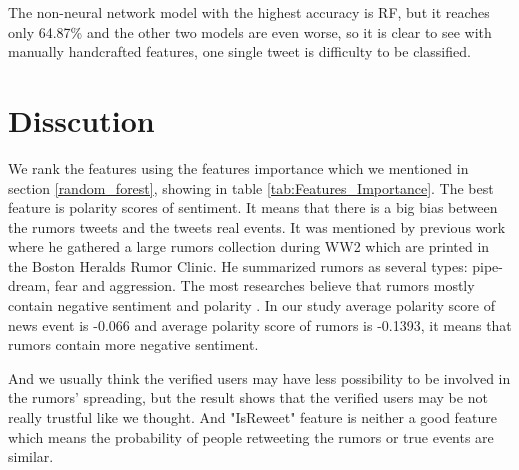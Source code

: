  The non-neural network model with the highest accuracy is RF, but it reaches only 64.87\% and the other two models are even worse, so it is clear to see with manually handcrafted features, one single tweet is difficulty to be classified.  
 \begin{table}[!h]
 \centering
{}
 \caption{Prediction Accuracy of Different Single Tweet's Creditability Scoring Models}
 \label{tab:single_result}
\end{table}
 
 \section{Disscution}  

 We rank the features using the features importance which we mentioned in section \ref{random_forest}, showing in table \ref{tab:Features_Importance}. The best feature is polarity scores of sentiment. It means that there is a big bias between the rumors tweets and the tweets real events. It was mentioned by previous work \cite{allport1947psychology} where he gathered a large rumors collection during WW2 which are printed in the Boston Heralds Rumor Clinic. He summarized rumors as several types:  pipe-dream, fear and aggression. The most researches believe that rumors mostly contain negative sentiment and polarity \cite{sunstein2014rumors}\cite{kwon2013aspects}. In our study average polarity score of news event is -0.066 and average polarity score of rumors is -0.1393, it means that rumors contain more negative sentiment. 
 
 And we usually think the verified users may have less possibility to be involved in the rumors' spreading, but the result shows that the verified users may be not really trustful like we thought. And "IsReweet" feature is neither a good feature which means the probability of people retweeting the rumors or true events are similar.
 
